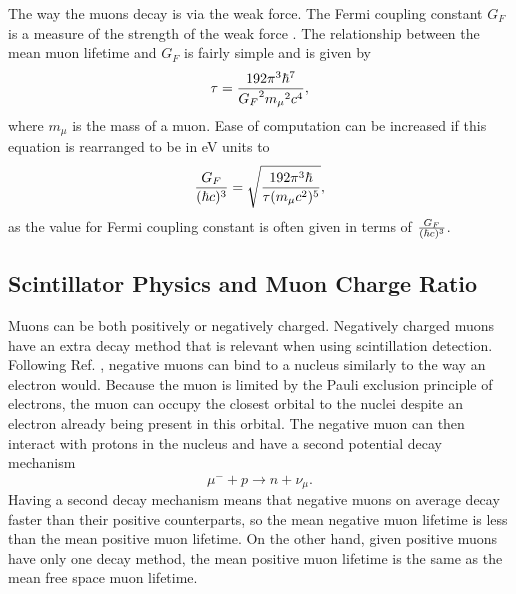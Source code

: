 \documentclass[11pt,letterpaper]{article}
\begin{document}
The way the muons decay is via the weak force. The Fermi coupling constant $G_F$ is a measure of the strength of the weak force \cite{Coan}. The relationship between the mean muon lifetime and $G_F$ is fairly simple and is given by
\begin{equation}
    \tau = {192 \pi^3 \hbar^7 \over {G_F}^2 {m_\mu}^2 c^4 },
\end{equation}
where $m_\mu$ is the mass of a muon. Ease of computation can be increased if this equation is rearranged to be in eV units to
\begin{equation}
    {G_F \over (\hbar c)^3} = \sqrt{{192 \pi^3 \hbar \over \tau (m_\mu c^2)^5}} ,
\end{equation}
as the value for Fermi coupling constant is often given in terms of ${G_F \over (\hbar c)^3}$.

\subsection{Scintillator Physics and Muon Charge Ratio}

Muons can be both positively or negatively charged. Negatively charged muons have an extra decay method that is relevant when using scintillation detection. Following Ref. \cite{Coan}, negative muons can bind to a nucleus similarly to the way an electron would. Because the muon is limited by the Pauli exclusion principle of electrons, the muon can occupy the closest orbital to the nuclei despite an electron already being present in this orbital. The negative muon can then interact with protons in the nucleus and have a second potential decay mechanism
\begin{equation}
    \mu^- + p \xrightarrow{} n + \nu_\mu .
\end{equation}
Having a second decay mechanism means that negative muons on average decay faster than their positive counterparts, so the mean negative muon lifetime is less than the mean positive muon lifetime. On the other hand, given positive muons have only one decay method, the mean positive muon lifetime is the same as the mean free space muon lifetime.
\end{document}
